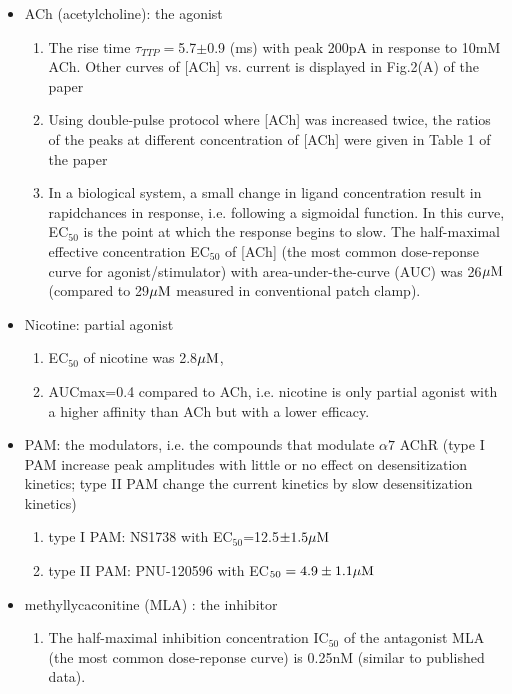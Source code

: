 \begin{itemize}
  \item ACh (acetylcholine): the agonist
  	\begin{enumerate}
     \item The rise time $\tau_{TTP}=$5.7$\pm$0.9 (ms) with peak 200pA in
   response to 10mM ACh. Other curves of [ACh] vs. current is displayed in Fig.2(A) of the
  paper \citep{friis2009}
     \item Using double-pulse protocol where [ACh] was increased twice, the
   ratios of the peaks at different concentration of [ACh] were given in Table 1 of the
  paper \cite{friis2009} 
     \item In a biological system, a small change in ligand concentration
     result in rapidchances in response, i.e. following a sigmoidal
     function. In this curve, EC$_{50}$ is the point at which the response
     begins to slow. The half-maximal effective concentration EC$_{50}$ of [ACh]
     (the most common dose-reponse curve for agonist/stimulator) with area-under-the-curve
     (AUC) was 26${\mu\text{M}}$ (compared to 29${\mu\text{M}}$ measured in conventional patch
     clamp).
    \end{enumerate}
    
  \item Nicotine: partial agonist
  \begin{enumerate}
    \item EC$_{50}$ of nicotine was 2.8${\mu\text{M}}$, 
    \item AUCmax=0.4 compared to ACh, i.e. nicotine is only partial agonist with
    a higher affinity than  ACh but with a lower efficacy. 
  \end{enumerate}
  
  \item PAM: the modulators, i.e. the compounds that modulate $\alpha7$ AChR
  (type I PAM increase peak amplitudes with little or no effect on
  desensitization kinetics; type II PAM change the current kinetics by slow
  desensitization kinetics)
  \citep{gronlien2007}
  \begin{enumerate}
    \item type I PAM: NS1738 with EC$_{50}$=12.5$\pm 1.5{\mu\text{M}}$
    \item type II PAM: PNU-120596 with EC$_{50}=4.9\pm 1.1{\mu\text{M}}$
  \end{enumerate}
  
  \item methyllycaconitine (MLA) : the inhibitor
  \begin{enumerate}
     \item The half-maximal inhibition concentration IC$_{50}$ of the antagonist
     MLA (the most common dose-reponse curve) is 0.25nM
     (similar to published data). 
  \end{enumerate}
\end{itemize}


